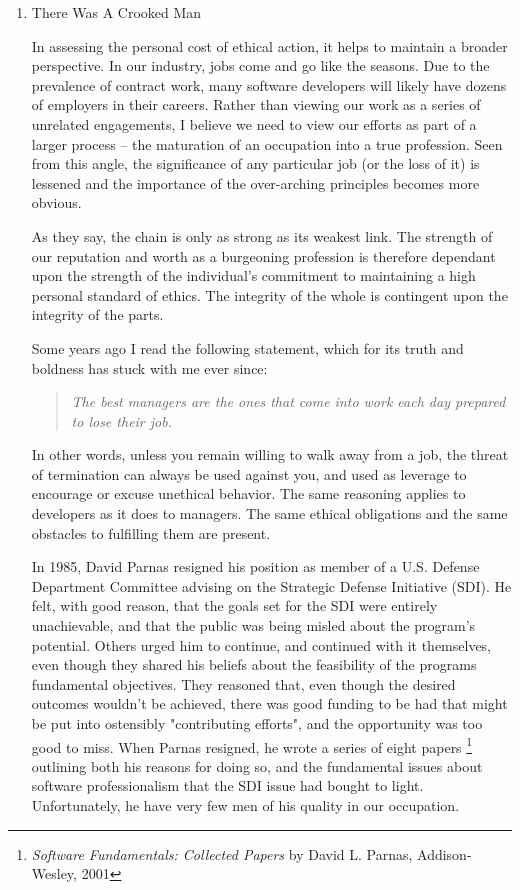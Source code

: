 \documentclass{article}
\begin{document}
\begin{enumerate}
\item There Was A Crooked Man
\label{sec:orgheadline407}

In assessing the personal cost of ethical action, it helps to maintain a
broader perspective. In our industry, jobs come and go like the seasons.
Due to the prevalence of contract work, many software developers will
likely have dozens of employers in their careers. Rather than viewing
our work as a series of unrelated engagements, I believe we need to view
our efforts as part of a larger process -- the maturation of an
occupation into a true profession. Seen from this angle, the
significance of any particular job (or the loss of it) is lessened and
the importance of the over-arching principles becomes more obvious.

As they say, the chain is only as strong as its weakest link. The
strength of our reputation and worth as a burgeoning profession is
therefore dependant upon the strength of the individual's commitment to
maintaining a high personal standard of ethics. The integrity of the
whole is contingent upon the integrity of the parts.

Some years ago I read the following statement, which for its truth and
boldness has stuck with me ever since:

\begin{quote}
\emph{The best managers are the ones that come into work each day prepared
to lose their job.}
\end{quote}

In other words, unless you remain willing to walk away from a job, the
threat of termination can always be used against you, and used as
leverage to encourage or excuse unethical behavior. The same reasoning
applies to developers as it does to managers. The same ethical
obligations and the same obstacles to fulfilling them are present.

In 1985, David Parnas resigned his position as member of a U.S. Defense
Department Committee advising on the Strategic Defense Initiative (SDI).
He felt, with good reason, that the goals set for the SDI were entirely
unachievable, and that the public was being misled about the program's
potential. Others urged him to continue, and continued with it
themselves, even though they shared his beliefs about the feasibility of
the programs fundamental objectives. They reasoned that, even though the
desired outcomes wouldn't be achieved, there was good funding to be had
that might be put into ostensibly "contributing efforts", and the
opportunity was too good to miss. When Parnas resigned, he wrote a
series of eight papers \footnote{\emph{Software Fundamentals: Collected Papers} by David L. Parnas,
Addison-Wesley, 2001} outlining both his reasons for doing so,
and the fundamental issues about software professionalism that the SDI
issue had bought to light. Unfortunately, he have very few men of his
quality in our occupation.


\end{enumerate}
\end{document}
